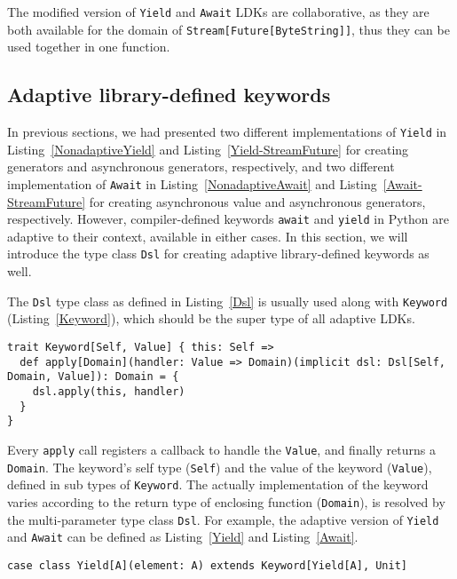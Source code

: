 The modified version of \lstinline{Yield} and \lstinline{Await} LDKs are collaborative, as they are both available for the domain of \lstinline{Stream[Future[ByteString]]}, thus they can be used together in one function.

\subsection{Adaptive library-defined keywords}\label{Adaptive library-defined keywords}

In previous sections, we had presented two different implementations of \lstinline{Yield} in Listing~\ref{NonadaptiveYield} and Listing~\ref{Yield-StreamFuture} for creating generators and asynchronous generators, respectively, and two different implementation of \lstinline{Await} in Listing~\ref{NonadaptiveAwait} and Listing~\ref{Await-StreamFuture} for creating asynchronous value and asynchronous generators, respectively. However, compiler-defined keywords \lstinline{await} and \lstinline{yield} in Python are adaptive to their context, available in either cases. In this section, we will introduce the type class \lstinline{Dsl} for creating adaptive library-defined keywords as well.

The \lstinline{Dsl} type class as defined in Listing~\ref{Dsl} is usually used along with \lstinline{Keyword} (Listing~\ref{Keyword}), which should be the super type of all adaptive LDKs.

\begin{lstlisting}[caption={\lstinline{Keyword}, the super type of all adaptive LDKs},label={Keyword}]
trait Keyword[Self, Value] { this: Self =>
  def apply[Domain](handler: Value => Domain)(implicit dsl: Dsl[Self, Domain, Value]): Domain = {
    dsl.apply(this, handler)
  }
}
\end{lstlisting}

Every \lstinline{apply} call registers a callback to handle the \lstinline{Value}, and finally returns a \lstinline{Domain}. The keyword's self type (\lstinline{Self}) and the value of the keyword (\lstinline{Value}), defined in sub types of \lstinline{Keyword}. The actually implementation of the keyword varies according to the return type of enclosing function (\lstinline{Domain}), is resolved by the multi-parameter type class \lstinline{Dsl}. For example, the adaptive version of \lstinline{Yield} and \lstinline{Await} can be defined as Listing~\ref{Yield} and Listing~\ref{Await}.

\begin{lstlisting}[caption={The \lstinline{Yield} LDK, the adaptive version},label={Yield}]
case class Yield[A](element: A) extends Keyword[Yield[A], Unit]
\end{lstlisting}

